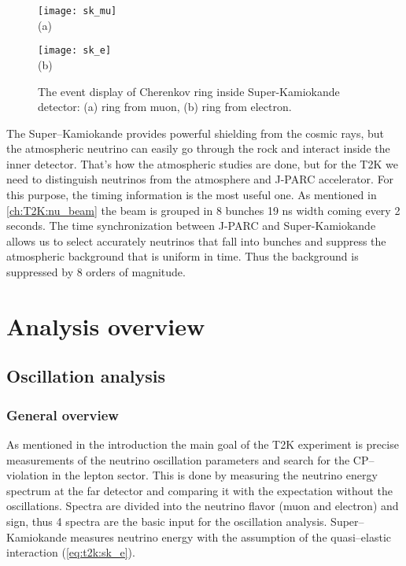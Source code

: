 \documentclass[../main.tex]{subfiles}
\begin{document}
\begin{figure}[!ht]
  \centering
  \begin{minipage}{0.49\linewidth}
    \centering
    \texttt{[image: sk\_mu]} \\ (a)
  \end{minipage}
  \begin{minipage}{0.49\linewidth}
    \centering
    \texttt{[image: sk\_e]} \\ (b)
  \end{minipage}
    \caption{The event display of Cherenkov ring inside Super-Kamiokande detector: (a) ring from muon, (b) ring from electron.}
    \label{fig:T2K:sk_PID}
\end{figure}

The Super--Kamiokande provides powerful shielding from the cosmic rays, but the atmospheric neutrino can easily go through the rock and interact inside the inner detector. That's how the atmospheric studies are done, but for the T2K we need to distinguish neutrinos from the atmosphere and J-PARC accelerator. For this purpose, the timing information is the most useful one. As mentioned in \autoref{ch:T2K:nu_beam} the beam is grouped in 8 bunches 19 ns width coming every 2 seconds. The time synchronization between J-PARC and Super-Kamiokande allows us to select accurately neutrinos that fall into bunches and suppress the atmospheric background that is uniform in time. Thus the background is suppressed by 8 orders of magnitude.


\section{Analysis overview}
\subsection{Oscillation analysis}
\subsubsection{General overview}
As mentioned in the introduction the main goal of the T2K experiment is precise measurements of the neutrino oscillation parameters and search for the CP--violation in the lepton sector. This is done by measuring the neutrino energy spectrum at the far detector and comparing it with the expectation without the oscillations. Spectra are divided into the neutrino flavor (muon and electron) and sign, thus 4 spectra are the basic input for the oscillation analysis. Super--Kamiokande measures neutrino energy with the assumption of the quasi--elastic interaction (\autoref{eq:t2k:sk_e}).
\end{document}
